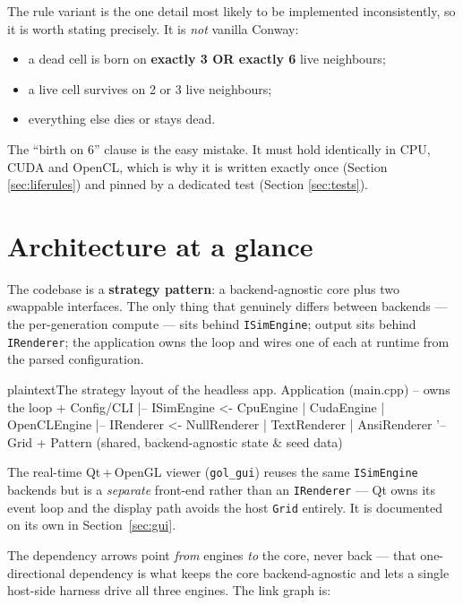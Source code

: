 \documentclass[
	english,
	letterpaper, oneside
]{article}
\begin{document}
The rule variant is the one detail most likely to be implemented inconsistently,
so it is worth stating precisely. It is \emph{not} vanilla Conway:

\begin{itemize}
	\item a dead cell is born on \textbf{exactly 3 OR exactly 6} live neighbours;
	\item a live cell survives on 2 or 3 live neighbours;
	\item everything else dies or stays dead.
\end{itemize}

The ``birth on 6'' clause is the easy mistake. It must hold identically in CPU,
CUDA and OpenCL, which is why it is written exactly once (Section
\ref{sec:liferules}) and pinned by a dedicated test (Section \ref{sec:tests}).

\section{Architecture at a glance}
\label{sec:arch}

The codebase is a \textbf{strategy pattern}: a backend-agnostic core plus two
swappable interfaces. The only thing that genuinely differs between backends ---
the per-generation compute --- sits behind \texttt{ISimEngine}; output sits
behind \texttt{IRenderer}; the application owns the loop and wires one of each at
runtime from the parsed configuration.

\begin{sourcecode}{plaintext}{The strategy layout of the headless app.}
Application (main.cpp)  -- owns the loop + Config/CLI
  |-- ISimEngine   <- CpuEngine | CudaEngine | OpenCLEngine
  |-- IRenderer    <- NullRenderer | TextRenderer | AnsiRenderer
  '-- Grid + Pattern  (shared, backend-agnostic state & seed data)
\end{sourcecode}

The real-time Qt\,+\,OpenGL viewer (\texttt{gol\_gui}) reuses the same
\texttt{ISimEngine} backends but is a \emph{separate} front-end rather than an
\texttt{IRenderer} --- Qt owns its event loop and the display path avoids the host
\texttt{Grid} entirely. It is documented on its own in Section~\ref{sec:gui}.

The dependency arrows point \emph{from} engines \emph{to} the core, never back ---
that one-directional dependency is what keeps the core backend-agnostic and lets a
single host-side harness drive all three engines. The link graph is:
\end{document}

